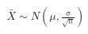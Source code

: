 \documentclass[preview]{standalone}
\begin{document}
\begin{align*}
\bar{X} \sim N\left(\mu, \frac{\sigma}{\sqrt{n}}\right)
\end{align*}
\end{document}
